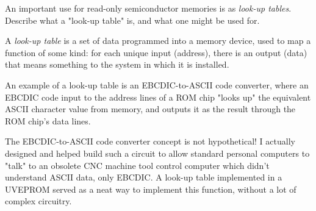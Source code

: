 

An important use for read-only semiconductor memories is as {\it look-up tables}.  Describe what a "look-up table" is, and what one might be used for.







A {\it look-up table} is a set of data programmed into a memory device, used to map a function of some kind: for each unique input (address), there is an output (data) that means something to the system in which it is installed.

An example of a look-up table is an EBCDIC-to-ASCII code converter, where an EBCDIC code input to the address lines of a ROM chip "looks up" the equivalent ASCII character value from memory, and outputs it as the result through the ROM chip's data lines.







The EBCDIC-to-ASCII code converter concept is not hypothetical!  I actually designed and helped build such a circuit to allow standard personal computers to "talk" to an obsolete CNC machine tool control computer which didn't understand ASCII data, only EBCDIC.  A look-up table implemented in a UVEPROM served as a neat way to implement this function, without a lot of complex circuitry.




